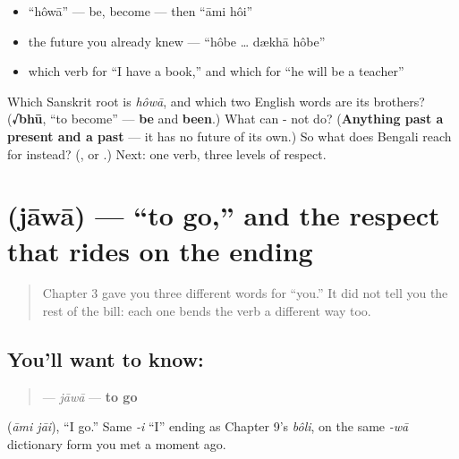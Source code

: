 \begin{itemize}
\raggedright
  \item \textquotedblleft{}hôwā\textquotedblright{} — be, become — then \textquotedblleft{}āmi hôi\textquotedblright{}
  \item the future you already knew — \textquotedblleft{}hôbe … dækhā hôbe\textquotedblright{}
  \item which verb for \textquotedblleft{}I have a book,\textquotedblright{} and which for \textquotedblleft{}he will be a teacher\textquotedblright{}
\end{itemize}

\begin{tcolorbox}[breakable,colback=teal!4,colframe=teal!35!black,title={Before you move on}]
Which Sanskrit root is \emph{hôwā}, and which two English words are its brothers? (\textbf{√bhū}, \textquotedblleft{}to become\textquotedblright{} — \textbf{be} and \textbf{been}.) What can - not do? (\textbf{Anything past a present and a past} — it has no future of its own.) So what does Bengali reach for instead? (\textbf{}, or .) Next: one verb, three levels of respect.
\end{tcolorbox}
\section[jāwā]{ (jāwā) — \textquotedblleft{}to go,\textquotedblright{} and the respect that rides on the ending}

\label{lesson:BN-C07-jaowa}



\begin{quote}
Chapter 3 gave you three different words for \textquotedblleft{}you.\textquotedblright{} It did not tell you the rest of the bill: each one bends the verb a different way too.
\end{quote}

\subsection*{You'll want to know: }
\begin{quote}
\textbf{} — \emph{jāwā} — \textbf{to go}
\end{quote}

  (\emph{āmi jāi}), \textquotedblleft{}I go.\textquotedblright{} Same \emph{-i} \textquotedblleft{}I\textquotedblright{} ending as Chapter 9's \emph{bôli}, on the same \emph{-wā} dictionary form you met a moment ago.

